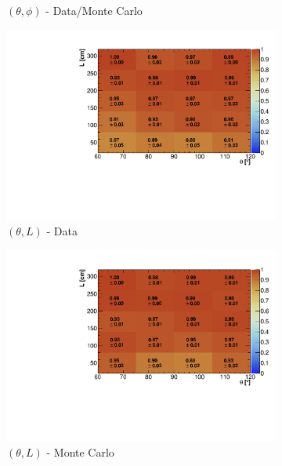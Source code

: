\documentclass[a4paper,11pt]{article}
\begin{document}
\begin{figure}[htbp]
\begin{subfigure}{0.33\textwidth}
  \caption{$(\theta,\phi)$ - Data/Monte Carlo}
\end{subfigure}
\begin{subfigure}{0.33\textwidth}
  \includegraphics[width=\linewidth]{figures/e_theta_l.pdf}
  \caption{$(\theta,L)$ - Data}
\end{subfigure}\begin{subfigure}{0.33\textwidth}
\includegraphics[width=\linewidth]{figures/theta_l_mc.pdf}
\caption{$(\theta,L)$ - Monte Carlo}
\end{subfigure}\begin{subfigure}{0.33\textwidth}

\end{subfigure}
\end{figure}
\end{document}
